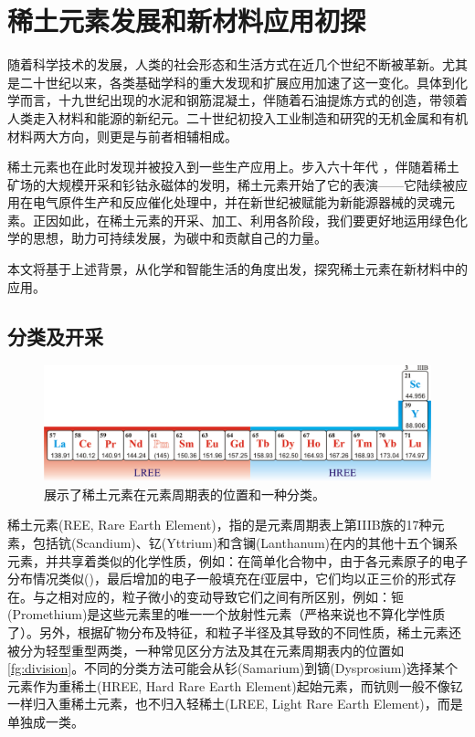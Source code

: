 \chapter{稀土元素发展和新材料应用初探}

随着科学技术的发展，人类的社会形态和生活方式在近几个世纪不断被革新。尤其是二十世纪以来，各类基础学科的重大发现和扩展应用加速了这一变化。具体到化学而言，十九世纪出现的水泥和钢筋混凝土，伴随着石油提炼方式的创造，带领着人类走入材料和能源的新纪元。二十世纪初投入工业制造和研究的无机金属和有机材料两大方向，则更是与前者相辅相成。\cite{gan2014da}

稀土元素也在此时发现并被投入到一些生产应用上。步入六十年代 ，伴随着稀土矿场的大规模开采和钐钴永磁体的发明，稀土元素开始了它的表演——它陆续被应用在电气原件生产和反应催化处理中，并在新世纪被赋能为新能源器械的灵魂元素。正因如此，在稀土元素的开采、加工、利用各阶段，我们要更好地运用绿色化学的思想，助力可持续发展，为碳中和贡献自己的力量。\cite{Atwood_2012,Balaram_2019,Institute_2020}

本文将基于上述背景，从化学和智能生活的角度出发，探究稀土元素在新材料中的应用。

\section{分类及开采}

\begin{figure}[H]
    \centering
    \includegraphics[width=0.9\columnwidth]{../images/ree_division.png}
    \caption{展示了稀土元素在元素周期表的位置和一种分类。\cite{Generalic_2012}\label{fg:division}}
\end{figure}
稀土元素(REE, Rare Earth Element)，指的是元素周期表上第IIIB族的17种元素，包括钪(Scandium)、钇(Yttrium)和含镧(Lanthanum)在内的其他十五个镧系元素，并共享着类似的化学性质，例如：在简单化合物中，由于各元素原子的电子分布情况类似()，最后增加的电子一般填充在f亚层中，它们均以正三价的形式存在。与之相对应的，粒子微小的变动导致它们之间有所区别，例如：钷(Promethium)是这些元素里的唯一一个放射性元素（严格来说也不算化学性质了）。另外，根据矿物分布及特征，和粒子半径及其导致的不同性质，稀土元素还被分为轻型重型两类，一种常见区分方法及其在元素周期表内的位置如\autoref{fg:division}。不同的分类方法\cite{Generalic_2012,Atwood_2012,baipi_2012}可能会从钐(Samarium)到镝(Dysprosium)选择某个元素作为重稀土(HREE, Hard Rare Earth Element)起始元素，而钪则一般不像钇一样归入重稀土元素，也不归入轻稀土(LREE, Light Rare Earth Element)，而是单独成一类。

